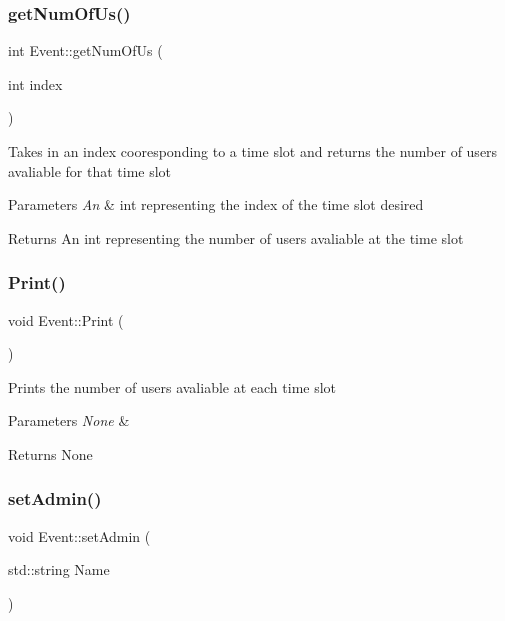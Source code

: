 \subsubsection{\texorpdfstring{get\+Num\+Of\+Us()}{getNumOfUs()}}
{\footnotesize\ttfamily int Event\+::get\+Num\+Of\+Us (\begin{DoxyParamCaption}\item[{int}]{index }\end{DoxyParamCaption})}

Takes in an index cooresponding to a time slot and returns the number of users avaliable for that time slot 
\begin{DoxyParams}{Parameters}
{\em An} & int representing the index of the time slot desired \\
\hline
\end{DoxyParams}
\begin{DoxyReturn}{Returns}
An int representing the number of users avaliable at the time slot 
\end{DoxyReturn}
\mbox{\label{class_event_a8087f742c473db50d2dda834de64ad1f}} 
\subsubsection{\texorpdfstring{Print()}{Print()}}
{\footnotesize\ttfamily void Event\+::\+Print (\begin{DoxyParamCaption}{ }\end{DoxyParamCaption})}

Prints the number of users avaliable at each time slot 
\begin{DoxyParams}{Parameters}
{\em None} & \\
\hline
\end{DoxyParams}
\begin{DoxyReturn}{Returns}
None 
\end{DoxyReturn}
\mbox{\label{class_event_aec0fa6f68332424cdfb15855765cadf3}} 
\subsubsection{\texorpdfstring{set\+Admin()}{setAdmin()}}
{\footnotesize\ttfamily void Event\+::set\+Admin (\begin{DoxyParamCaption}\item[{std\+::string}]{Name }\end{DoxyParamCaption})}

